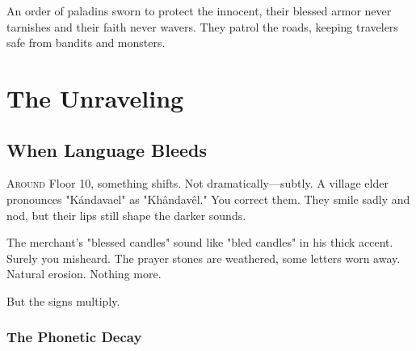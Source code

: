 \documentclass[11pt,a4paper,twoside]{book}
\newcommand{\fadetext}[1]{%
    \textcolor{ink!30}{#1}%
}
\newcommand{\fancybreak}{%
    \begin{center}
    \pgfornament[width=3cm]{88}
    \end{center}
}
\begin{document}
An order of paladins sworn to protect the innocent, their blessed armor never tarnishes and their faith never wavers. They patrol the roads, keeping travelers safe from bandits and monsters.

\fancybreak

\part{The Unraveling}

\chapter{When Language Bleeds}

\lettrine[lines=4]{\color{dusk}A}{round} Floor 10, something shifts. Not dramatically—subtly. A village elder pronounces "Kándavael" as "Khândavêl." You correct them. They smile sadly and nod, but their lips still shape the darker sounds. 

The merchant's "blessed candles" sound like "bled candles" in his thick accent. Surely you misheard. The prayer stones are weathered, some letters worn away. Natural erosion. Nothing more.

But the signs multiply.

\section{The Phonetic Decay}

\begin{center}
\end{center}
\end{document}
